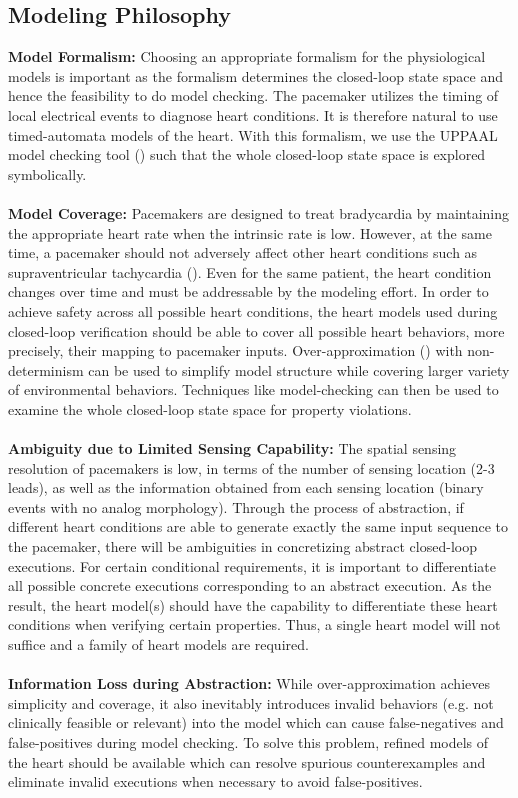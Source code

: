 \subsection{Modeling Philosophy}
\textbf{Model Formalism: }Choosing an appropriate formalism for the physiological models is important as the formalism determines the closed-loop state space and hence the feasibility to do model checking. The pacemaker utilizes the timing of local electrical events to diagnose heart conditions. It is therefore natural to use timed-automata models of the heart. With this formalism, we use the UPPAAL model checking tool (\cite{uppaal_tut}) such that the whole closed-loop state space is explored symbolically.\\\\
\textbf{Model Coverage: } Pacemakers are designed to treat bradycardia by maintaining the appropriate heart rate when the intrinsic rate is low. However, at the same time, a pacemaker should not adversely affect other heart conditions such as supraventricular tachycardia (\cite{pacemakerrecalls}). Even for the same patient, the heart condition changes over time and must be addressable by the modeling effort. In order to achieve safety across all possible heart conditions, the heart models used during closed-loop verification should be able to cover all possible heart behaviors, more precisely, their mapping to pacemaker inputs. Over-approximation (\cite{CEGAR}) with non-determinism can be used to simplify model structure while covering larger variety of environmental behaviors. Techniques like model-checking can then be used to examine the whole closed-loop state space for property violations.\\\\ 
\textbf{Ambiguity due to Limited Sensing Capability: }The spatial sensing resolution of pacemakers is low, in terms of the number of sensing location (2-3 leads), as well as the information obtained from each sensing location (binary events with no analog morphology). Through the process of abstraction, if different heart conditions are able to generate exactly the same input sequence to the pacemaker, there will be ambiguities in concretizing abstract closed-loop executions. For certain conditional requirements, it is important to differentiate all possible concrete executions corresponding to an abstract execution. As the result, the heart model(s) should have the capability to differentiate these heart conditions when verifying certain properties. Thus, a single heart model will not suffice and a family of heart models are required.\\\\
\textbf{Information Loss during Abstraction: }While over-approximation achieves simplicity and coverage, it also inevitably introduces invalid behaviors (e.g. not clinically feasible or relevant) into the model which can cause false-negatives and false-positives during model checking. To solve this problem, refined models of the heart should be available which can resolve spurious counterexamples and eliminate invalid executions when necessary to avoid false-positives.

